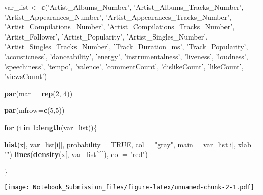 \documentclass[
]{article}
\newenvironment{Shaded}{\begin{snugshade}}{\end{snugshade}}
\newcommand{\ControlFlowTok}[1]{\textcolor[rgb]{0.13,0.29,0.53}{\textbf{#1}}}
\newcommand{\DataTypeTok}[1]{\textcolor[rgb]{0.13,0.29,0.53}{#1}}
\newcommand{\DecValTok}[1]{\textcolor[rgb]{0.00,0.00,0.81}{#1}}
\newcommand{\KeywordTok}[1]{\textcolor[rgb]{0.13,0.29,0.53}{\textbf{#1}}}
\newcommand{\NormalTok}[1]{#1}
\newcommand{\OperatorTok}[1]{\textcolor[rgb]{0.81,0.36,0.00}{\textbf{#1}}}
\newcommand{\OtherTok}[1]{\textcolor[rgb]{0.56,0.35,0.01}{#1}}
\newcommand{\StringTok}[1]{\textcolor[rgb]{0.31,0.60,0.02}{#1}}
\begin{document}
\begin{Shaded}
\begin{Highlighting}[]
\NormalTok{var_list <-}\StringTok{ }\KeywordTok{c}\NormalTok{(}\StringTok{'Artist_Albums_Number'}\NormalTok{, }\StringTok{'Artist_Albums_Tracks_Number'}\NormalTok{, }\StringTok{'Artist_Appearances_Number'}\NormalTok{, }\StringTok{'Artist_Appearances_Tracks_Number'}\NormalTok{, }\StringTok{'Artist_Compilations_Number'}\NormalTok{, }\StringTok{'Artist_Compilations_Tracks_Number'}\NormalTok{, }\StringTok{'Artist_Follower'}\NormalTok{, }\StringTok{'Artist_Popularity'}\NormalTok{, }\StringTok{'Artist_Singles_Number'}\NormalTok{, }\StringTok{'Artist_Singles_Tracks_Number'}\NormalTok{, }\StringTok{'Track_Duration_ms'}\NormalTok{, }\StringTok{'Track_Popularity'}\NormalTok{, }\StringTok{'acousticness'}\NormalTok{, }\StringTok{'danceability'}\NormalTok{, }\StringTok{'energy'}\NormalTok{, }\StringTok{'instrumentalness'}\NormalTok{, }\StringTok{'liveness'}\NormalTok{, }\StringTok{'loudness'}\NormalTok{, }\StringTok{'speechiness'}\NormalTok{, }\StringTok{'tempo'}\NormalTok{, }\StringTok{'valence'}\NormalTok{, }\StringTok{'commentCount'}\NormalTok{, }\StringTok{'dislikeCount'}\NormalTok{, }\StringTok{'likeCount'}\NormalTok{, }\StringTok{'viewsCount'}\NormalTok{)}

\KeywordTok{par}\NormalTok{(}\DataTypeTok{mar =} \KeywordTok{rep}\NormalTok{(}\DecValTok{2}\NormalTok{, }\DecValTok{4}\NormalTok{))}

\KeywordTok{par}\NormalTok{(}\DataTypeTok{mfrow=}\KeywordTok{c}\NormalTok{(}\DecValTok{5}\NormalTok{,}\DecValTok{5}\NormalTok{))}

\ControlFlowTok{for}\NormalTok{ (i }\ControlFlowTok{in} \DecValTok{1}\OperatorTok{:}\KeywordTok{length}\NormalTok{(var_list))\{}
  
  \KeywordTok{hist}\NormalTok{(x[, var_list[i]], }\DataTypeTok{probability =} \OtherTok{TRUE}\NormalTok{, }\DataTypeTok{col =} \StringTok{"gray"}\NormalTok{, }\DataTypeTok{main =}\NormalTok{ var_list[i], }\DataTypeTok{xlab =} \StringTok{""}\NormalTok{)}
  \KeywordTok{lines}\NormalTok{(}\KeywordTok{density}\NormalTok{(x[, var_list[i]]), }\DataTypeTok{col =} \StringTok{"red"}\NormalTok{)}

\NormalTok{\}}
\end{Highlighting}
\end{Shaded}

\texttt{[image: Notebook\_Submission\_files/figure-latex/unnamed-chunk-2-1.pdf]}
\end{document}
